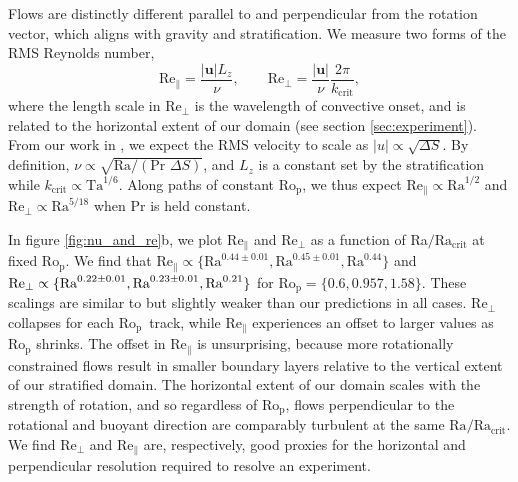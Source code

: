 \documentclass[twocolumn, amsmath, amsfonts, amssymb, trackchanges]{aastex62}
\newcommand{\pro}{\ensuremath{\text{Ro}_{\text{p}}}}
\begin{document}
Flows are distinctly different parallel to and perpendicular
from the rotation vector, which aligns with gravity and stratification.
We measure two forms of the RMS Reynolds number,
\begin{equation}
\text{Re}_{\parallel} = \frac{|\bm{u}| L_z}{\nu}, \qquad
\text{Re}_{\perp}     = \frac{|\bm{u}|}{\nu}\frac{2\pi}{k_{\text{crit}}},
\label{eqn:re_defn}
\end{equation}
where the length scale in $\text{Re}_{\perp}$ is the wavelength of convective onset, and is
related to the horizontal extent of our domain (see section \ref{sec:experiment}).
From our work in \AB, we expect the RMS velocity to scale as $|u| \propto \sqrt{\Delta S}$.
By definition, $\nu \propto \sqrt{\text{Ra}/(\text{Pr }\Delta S)}$, and $L_z$ is a constant
set by the stratification while $k_{\text{crit}} \propto \text{Ta}^{1/6}$. Along paths of
constant \pro, we thus expect $\text{Re}_{\parallel} \propto \text{Ra}^{1/2}$ and
$\text{Re}_{\perp} \propto \text{Ra}^{5/18}$ when $\text{Pr}$ is held constant.

In figure \ref{fig:nu_and_re}b, we plot $\text{Re}_{\parallel}$ and $\text{Re}_{\perp}$
as a function of Ra$/\text{Ra}_{\text{crit}}$ at fixed \pro. We find that $\text{Re}_\parallel \propto \{\text{Ra}^{0.44 \pm 0.01}, \text{Ra}^{0.45 \pm 0.01}, \text{Ra}^{0.44}\}$
and $\text{Re}_\perp \propto \{\text{Ra}^{0.22 \pm 0.01}, \\ \text{Ra}^{0.23 \pm 0.01}, \text{Ra}^{0.21}\}$ for
$\pro = \{0.6, 0.957, 1.58\}$. These scalings are similar to but slightly weaker than our
predictions in all cases.  $\text{Re}_{\perp}$ collapses for each $\pro\,$ track,
while $\text{Re}_{\parallel}$ experiences an offset
to larger values as $\pro$ shrinks. The offset in $\text{Re}_{\parallel}$ is unsurprising, 
because more rotationally constrained flows result in smaller boundary layers relative to the 
vertical extent of our stratified domain. The horizontal extent of our domain scales with the
strength of rotation, and so regardless of \pro, flows perpendicular
to the rotational and buoyant direction are comparably turbulent at the same 
$\text{Ra}/\text{Ra}_\text{crit}$.
We find $\text{Re}_{\perp}$ and $\text{Re}_{\parallel}$ are, respectively, good proxies for
the horizontal and perpendicular resolution required to resolve an experiment.
\end{document}
